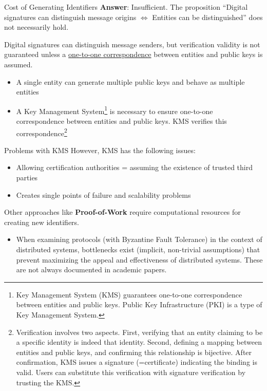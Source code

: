 \documentclass[aspectratio=169,10pt]{beamer}
\newenvironment{outlineblock}[1][]
{\begin{tcolorbox}[colframe=black, colback=white, boxrule=1pt, boxsep=5pt]}
{\end{tcolorbox}}
\begin{document}
\begin{frame}{Cost of Generating Identifiers}
\textbf{Answer}: Insufficient.
The proposition ``Digital signatures can distinguish message origins $\Leftrightarrow$ Entities can be distinguished'' does not necessarily hold.

\begin{outlineblock}
    Digital signatures can distinguish message senders, but verification validity is not guaranteed unless a \underline{one-to-one correspondence} between entities and public keys is assumed.
\end{outlineblock}

\begin{itemize}
    \item A single entity can generate multiple public keys and behave as multiple entities
    \item A Key Management System\footnote{Key Management System (KMS) guarantees one-to-one correspondence between entities and public keys. Public Key Infrastructure (PKI) is a type of Key Management System.} is necessary to ensure one-to-one correspondence between entities and public keys. KMS verifies this correspondence\footnote{Verification involves two aspects. First, verifying that an entity claiming to be a specific identity is indeed that identity. Second, defining a mapping between entities and public keys, and confirming this relationship is bijective. After confirmation, KMS issues a signature (=certificate) indicating the binding is valid. Users can substitute this verification with signature verification by trusting the KMS.}
\end{itemize}
\end{frame}

\begin{frame}{Problems with KMS}
However, KMS has the following issues:
\begin{itemize}
    \item Allowing certification authorities = assuming the existence of trusted third parties
    \item Creates single points of failure and scalability problems
\end{itemize}
Other approaches like \textbf{Proof-of-Work} require computational resources for creating new identifiers.

\begin{outlineblock}
    \begin{itemize}
        \item When examining protocols (with Byzantine Fault Tolerance) in the context of distributed systems, bottlenecks exist (implicit, non-trivial assumptions) that prevent maximizing the appeal and effectiveness of distributed systems. These are not always documented in academic papers.
    \end{itemize}
\end{outlineblock}

\end{frame}
\end{document}

